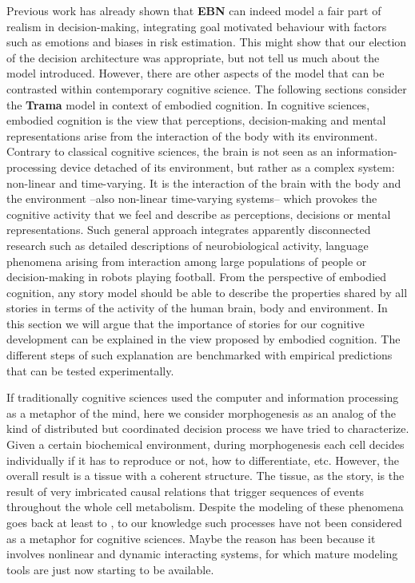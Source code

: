 \documentclass[
		twoside,openright,titlepage,numbers=noenddot,manychapters,
		headinclude,%
                footinclude=false,cleardoublepage=empty,
                BCOR=5mm,
		fontsize=11pt, %
                 enabledeprecatedfontcommands]{scrreprt}
\begin{document}
Previous work has already shown that \textbf{EBN} can indeed model a fair part of realism in decision-making, integrating goal motivated behaviour with factors such as emotions and biases in risk estimation. This might show that our election of the decision architecture was appropriate, but not tell us much about the model introduced. However, there are other aspects of the model that can be contrasted within contemporary cognitive science. The following sections consider the \textbf{Trama} model in context of embodied cognition. In cognitive sciences, embodied cognition is the view that perceptions, decision-making and mental representations arise from the interaction of the body with its environment. Contrary to classical cognitive sciences, the brain is not seen as an information-processing device detached of its environment, but rather  as a complex system: non-linear and time-varying. It is the interaction of the brain with the body and the environment --also non-linear time-varying systems-- which provokes the cognitive activity that we feel and describe as perceptions, decisions or mental representations. Such general approach integrates apparently disconnected research such as detailed descriptions of neurobiological activity, language phenomena arising from interaction among large populations of people or decision-making in robots playing football. From the perspective of embodied cognition, any story model should be able to describe the properties shared by all stories in terms of  the activity of the human brain, body and environment. In this section we will argue that the importance of stories for our cognitive development can be explained in the view proposed by embodied cognition.  The different steps of such explanation are benchmarked with empirical predictions that can be tested experimentally. 

 If traditionally cognitive sciences used the computer and information processing as a metaphor of the mind, here we consider morphogenesis as an analog of the kind of distributed but coordinated decision process we have tried to characterize. Given a certain biochemical environment, during morphogenesis each cell decides individually if it has to reproduce or not, how to differentiate, etc. However, the overall result is a tissue with a coherent structure. The tissue, as the story, is the result of very imbricated causal relations that trigger sequences of events throughout the whole cell metabolism. Despite the modeling of these phenomena goes back at least to \cite{Turing1952}, to our knowledge such processes have not been considered as a metaphor for cognitive sciences. Maybe the reason has been because it involves nonlinear and dynamic interacting systems, for which mature modeling tools are just now starting to be available. 
\end{document}
